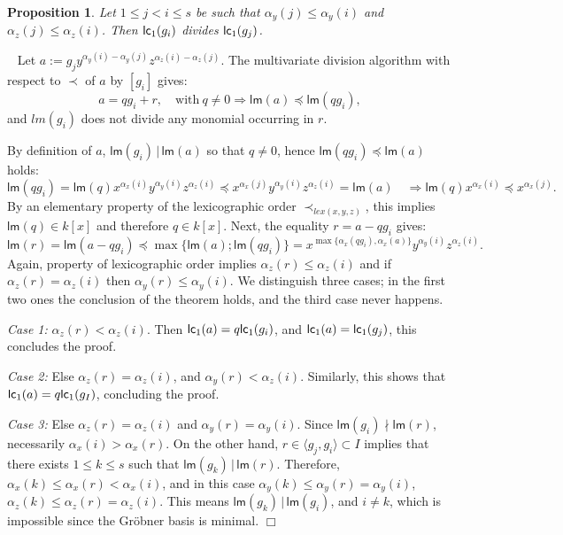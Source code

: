\documentclass[a4paper,11pt]{article}
\newcommand{\proof}{\noindent {\sc Proof:}~}
\newcommand{\foorp}{\hfill $\Box$}
\def\lm{\ensuremath{{\mathsf{lm}}}}
\def\lc{\ensuremath{{\sf lc}}}
\def\l{\ensuremath{\langle}}
\def\r{\ensuremath{\rangle}}
\newtheorem{Prop}{Proposition}
\begin{document}
\begin{Prop}\label{prop:1}
Let $1\le j < i \le s$ be such that
$\alpha_y(j) \le \alpha_y(i)$
and $\alpha_z(j)\le \alpha_z(i)$.
Then $\lc_1(g_i)$ divides $\lc_1(g_j)$.
\end{Prop}
\proof
Let $a:=g_j y^{\alpha_y(i)-\alpha_y(j)} z^{\alpha_z(i)-\alpha_z(j)}$.
The multivariate division algorithm with respect
to $\prec$ of $a$ by $[g_i]$ gives:
$$
a = q g_i + r,\quad \text{with} \
q\not=0 \Rightarrow \lm(a)\preccurlyeq \lm(q g_i),
$$
and $lm(g_i)$ does not
divide any monomial occurring in $r$.

By definition of $a$, $\lm(g_i)\, |\, \lm(a)$
so that $q\not=0$, hence $\lm(q g_i)\preccurlyeq \lm(a)$
holds:
$$
\lm(q g_i) = \lm(q) x^{\alpha_x(i)} y^{\alpha_y(i)}
z^{\alpha_z(i)} \preccurlyeq 
x^{\alpha_x(j)} y^{\alpha_y(i)}
z^{\alpha_z(i)}=\lm(a)\quad
\Rightarrow 
\lm(q) x^{\alpha_x(i)} \preccurlyeq x^{\alpha_x(j)}.
$$
By an elementary property of the lexicographic order $\prec_{lex(x,y,z)}$,
this implies $\lm(q)\in k[x]$ and therefore
$q\in k[x]$.
Next, the equality $r = a - q g_i$ gives:
$$
\lm(r) = \lm(a - q g_i)
\preccurlyeq \max\{ \lm(a) ; \lm(q g_i)\} =
x^{\max\{\alpha_x(q g_i),\alpha_x(a)\}}
y^{\alpha_y(i)}z^{\alpha_z(i)}.
$$
Again, property of lexicographic order
implies $\alpha_z(r)\le \alpha_z(i)$
and if $\alpha_z(r)=\alpha_z(i)$
then $\alpha_y(r) \le \alpha_y(i)$.
We distinguish three cases;
in the first two ones the conclusion
of the theorem holds, and the third case
never happens.
\smallskip

{\em Case 1:} $\alpha_z(r) < \alpha_z(i)$.
Then $\lc_1(a)=q \lc_1(g_i)$, and $\lc_1(a)=\lc_1(g_j)$,
this concludes the proof. 
\smallskip

{\em Case 2:} Else $\alpha_z(r) = \alpha_z(i)$,
and $\alpha_y(r)<\alpha_z(i)$. Similarly,
this shows that $\lc_1(a)=q\lc_1(g_I)$,
concluding the proof.
\smallskip

{\em Case 3:} Else $\alpha_z(r)=\alpha_z(i)$
and $\alpha_y(r) = \alpha_y(i)$.
Since $\lm(g_i) \nmid \lm(r)$,
necessarily $\alpha_x(i) > \alpha_x(r)$.
On the other hand, $r\in \l g_j,g_i\r\subset I$
implies that there exists $1\le k\le s$
such that $\lm(g_k)\, |\, \lm(r)$.
Therefore,
$\alpha_x(k)\le \alpha_x(r)<\alpha_x(i)$,
and in this case $\alpha_y(k) \le \alpha_y(r)=\alpha_y(i)$,
$\alpha_z(k)\le \alpha_z(r)=\alpha_z(i)$.
This means $\lm(g_k)\, |\, \lm(g_i)$,
and $i\not=k$, which is impossible since 
the Gr\"obner basis is minimal. \foorp
\end{document}
